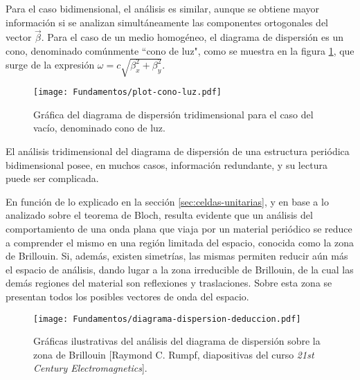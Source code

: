 Para el caso bidimensional, el análisis es similar, aunque se obtiene mayor información si se analizan simultáneamente las componentes ortogonales del vector $\vec{\beta}$. Para el caso de un medio homogéneo, el diagrama de dispersión es un cono, denominado comúnmente ``cono de luz", como se muestra en la figura \ref{fig:diagrama-dispersion-vacio-3d}, que surge de la expresión $\omega = c \sqrt{\beta_x^2 + \beta_y^2}$.

\begin{figure}[htp]
	\centering
	\texttt{[image: Fundamentos/plot-cono-luz.pdf]}
	\caption{Gráfica del diagrama de dispersión tridimensional para el caso del vacío, denominado cono de luz.}
	\label{fig:diagrama-dispersion-vacio-3d}
\end{figure}

El análisis tridimensional del diagrama de dispersión de una estructura periódica bidimensional posee, en muchos casos, información redundante, y su lectura puede ser complicada.

En función de lo explicado en la sección \ref{sec:celdas-unitarias}, y en base a lo analizado sobre el teorema de Bloch, resulta evidente que un análisis del comportamiento de una onda plana que viaja por un material periódico se reduce a comprender el mismo en una región limitada del espacio, conocida como la zona de Brillouin. Si, además, existen simetrías, las mismas permiten reducir aún más el espacio de análisis, dando lugar a la zona irreducible de Brillouin, de la cual las demás regiones del material son reflexiones y traslaciones. Sobre esta zona se presentan todos los posibles vectores de onda del espacio.

\begin{figure}[h]
	\centering
	\texttt{[image: Fundamentos/diagrama-dispersion-deduccion.pdf]}
	\caption{Gráficas ilustrativas del análisis del diagrama de dispersión sobre la zona de Brillouin [Raymond C. Rumpf, diapositivas del curso \textit{21st Century Electromagnetics}].}
	\label{fig:diagrama-dispersion-completo-deduccion}
\end{figure}

